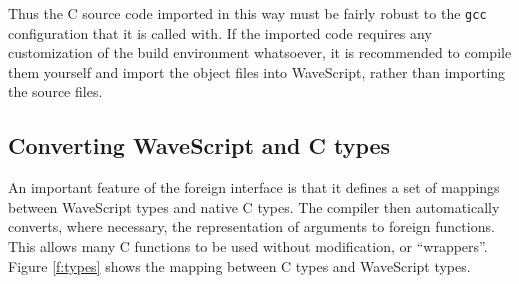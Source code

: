 Thus the C source code imported in this way must be fairly
robust to the {\tt gcc} configuration that it is called with.
If the imported code requires any customization of
the build environment whatsoever, it is recommended to compile them
yourself and import the object files into WaveScript, rather than
importing the source files.


\subsection{Converting WaveScript and C types}

An important feature of the foreign interface is that it defines a set
of mappings between WaveScript types and native C types.  The compiler
then automatically converts, where necessary, the representation of arguments to foreign
functions.
This allows many C functions to be used without modification, or ``wrappers''.  Figure
\ref{f:types} shows the mapping between C types and WaveScript types.


